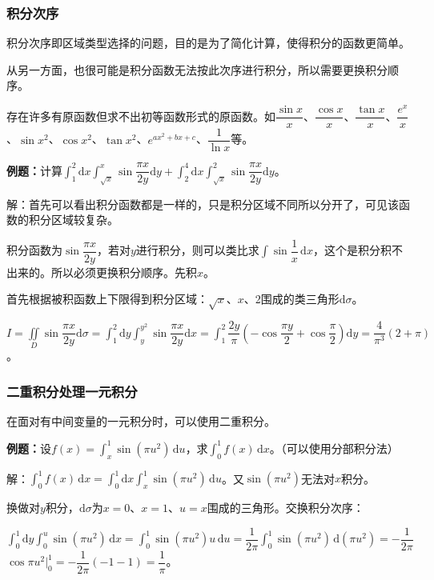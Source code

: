 \subsubsection{积分次序}

积分次序即区域类型选择的问题，目的是为了简化计算，使得积分的函数更简单。

从另一方面，也很可能是积分函数无法按此次序进行积分，所以需要更换积分顺序。

存在许多有原函数但求不出初等函数形式的原函数。如$\dfrac{\sin x}{x}$、$\dfrac{\cos x}{x}$、$\dfrac{\tan x}{x}$、$\dfrac{e^x}{x}$、$\sin x^2$、$\cos x^2$、$\tan x^2$、$e^{ax^2+bx+c}$、$\dfrac{1}{\ln x}$等。

\textbf{例题：}计算$\displaystyle{\int_1^2\textrm{d}x\int_{\sqrt{x}}^x\sin\dfrac{\pi x}{2y}\textrm{d}y+\int_2^4\textrm{d}x\int_{\sqrt{x}}^2\sin\dfrac{\pi x}{2y}\textrm{d}y}$。

解：首先可以看出积分函数都是一样的，只是积分区域不同所以分开了，可见该函数的积分区域较复杂。

积分函数为$\sin\dfrac{\pi x}{2y}$，若对$y$进行积分，则可以类比求$\displaystyle{\int\sin\dfrac{1}{x}\,\textrm{d}x}$，这个是积分积不出来的。所以必须更换积分顺序。先积$x$。

首先根据被积函数上下限得到积分区域：$\sqrt{x}$、$x$、2围成的类三角形$\textrm{d}\sigma$。

$I=\displaystyle{\iint\limits_D\sin\dfrac{\pi x}{2y}\textrm{d}\sigma}=\displaystyle{\int_1^2\textrm{d}y\int_y^{y^2}\sin\dfrac{\pi x}{2y}\textrm{d}x}=\displaystyle{\int_1^2\dfrac{2y}{\pi}\left(-\cos\dfrac{\pi y}{2}+\cos\dfrac{\pi}{2}\right)}\textrm{d}y=\dfrac{4}{\pi^3}(2+\pi)$。

\subsubsection{二重积分处理一元积分}

在面对有中间变量的一元积分时，可以使用二重积分。

\textbf{例题：}设$f(x)=\int_x^1\sin(\pi u^2)\,\textrm{d}u$，求$\int_0^1f(x)\,\textrm{d}x$。（可以使用分部积分法）

解：$\int_0^1f(x)\,\textrm{d}x=\int_0^1\textrm{d}x\int_x^1\sin(\pi u^2)\,\textrm{d}u$。又$\sin(\pi u^2)$无法对$x$积分。

换做对$y$积分，$\textrm{d}\sigma$为$x=0$、$x=1$、$u=x$围成的三角形。交换积分次序：

$\int_0^1\textrm{d}y\int_0^u\sin(\pi u^2)\,\textrm{d}x=\int_0^1\sin(\pi u^2)u\,\textrm{d}u=\dfrac{1}{2\pi}\int_0^1\sin(\pi u^2)\,\textrm{d}(\pi u^2)=-\dfrac{1}{2\pi}$\\$\cos\pi u^2|_0^1=-\dfrac{1}{2\pi}(-1-1)=\dfrac{1}{\pi}$。

